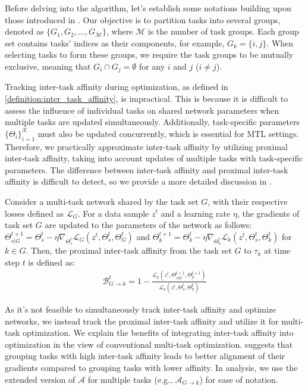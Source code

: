 Before delving into the algorithm, let's establish some notations building upon those introduced in . Our objective is to partition tasks into several groups, denoted as $\{G_1,G_2,...,G_{\mathcal{M}}\}$, where $\mathcal{M}$ is the number of task groups. Each group set contains tasks' indices as their components, for example, $G_k=\{i,j\}$. When selecting tasks to form these groups, we require the task groups to be mutually exclusive, meaning that $G_i \cap G_j = \emptyset$ for any $i$ and $j$ ($i \neq j$).

Tracking inter-task affinity during optimization, as defined in \cref{definition:inter_task_affinity}, is impractical. This is because it is difficult to assess the influence of individual tasks on shared network parameters when multiple tasks are updated simultaneously. Additionally, task-specific parameters $\{\Theta_i\}_{i=1}^{\mathcal{K}}$ must also be updated concurrently, which is essential for MTL settings. Therefore, we practically approximate inter-task affinity by utilizing proximal inter-task affinity, taking into account updates of multiple tasks with task-specific parameters. The difference between inter-task affinity and proximal inter-task affinity is difficult to detect, so we provide a more detailed discussion in .

\begin{definition} Consider a multi-task network shared by the task set $G$, with their respective losses defined as $\mathcal{L}_G$. For a data sample $z^t$ and a learning rate $\eta$, the gradients of task set $G$ are updated to the parameters of the network as follows: $\Theta_{s|G}^{t+1} = \Theta_s^t -\eta \nabla_{\Theta_s^t} \mathcal{L}_G (z^t, \Theta_s^t, \Theta_G^t)$ and $\Theta_k^{t+1} = \Theta_k^t -\eta \nabla_{\Theta_k^t} \mathcal{L}_k (z^t, \Theta_s^t, \Theta_k^t)$ for $k \in G$. Then, the proximal inter-task affinity from the task set $G$ to $\tau_k$ at time step $t$ is defined as:
\begin{align}
    \mathcal{B}^t_{G\rightarrow k} = 1- \frac{\mathcal{L}_k(z^t, \Theta_{s|G}^{t+1}, \Theta_k^{t+1})}{\mathcal{L}_k(z^t, \Theta_{s}^{t}, \Theta_k^t)}
\end{align}
\end{definition}

As it's not feasible to simultaneously track inter-task affinity and optimize networks, we instead track the proximal inter-task affinity and utilize it for multi-task optimization. We explain the benefits of integrating inter-task affinity into optimization in the view of conventional multi-task optimization.  suggests that grouping tasks with high inter-task affinity leads to better alignment of their gradients compared to grouping tasks with lower affinity. In analysis, we use the extended version of $\mathcal{A}$ for multiple tasks (e.g., $\mathcal{A}_{G\rightarrow k}$) for ease of notation.

